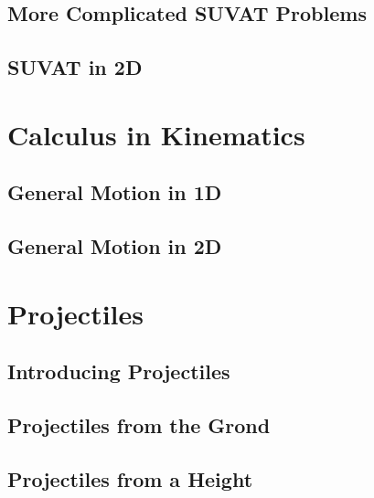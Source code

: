 \documentclass[../maths.tex]{subfiles}
\begin{document}
\subsection*{More Complicated SUVAT Problems}
\subsection*{SUVAT in 2D}
\section{Calculus in Kinematics}
\subsection*{General Motion in 1D}
\subsection*{General Motion in 2D}
\section{Projectiles}
\subsection*{Introducing Projectiles}
\subsection*{Projectiles from the Grond}
\subsection*{Projectiles from a Height}
\end{document}
